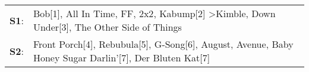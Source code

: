 \begin{supertabular}{p{0.03\textwidth}p{0.92\textwidth}}
 \textbf{S1}:  &  Bob[1]\textsuperscript{}, \enspace All In Time\textsuperscript{}, \enspace FF\textsuperscript{}, \enspace 2x2\textsuperscript{}, \enspace Kabump[2]\textsuperscript{} \textgreater \enspace Kimble\textsuperscript{}, \enspace Down Under[3]\textsuperscript{}, \enspace The Other Side of Things\textsuperscript{}  \enspace  \\
 \textbf{S2}:  &                           Front Porch[4]\textsuperscript{}, \enspace Rebubula[5]\textsuperscript{}, \enspace G-Song[6]\textsuperscript{}, \enspace August\textsuperscript{}, \enspace Avenue\textsuperscript{}, \enspace Baby Honey Sugar Darlin'[7]\textsuperscript{}, \enspace Der Bluten Kat[7]\textsuperscript{}  \enspace  \\
\end{supertabular}
